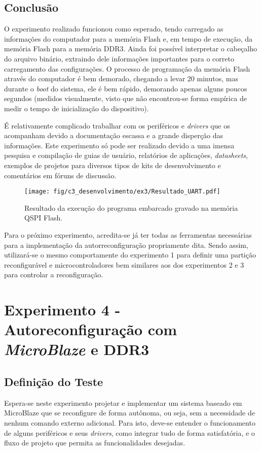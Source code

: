 \documentclass[11pt,a4paper,oneside]{book}
\begin{document}
\section{Conclusão}
O experimento realizado funcionou como esperado, tendo carregado as informações do computador para a memória Flash e, em tempo de execução, da memória Flash para a memória DDR3.
Ainda foi possível interpretar o cabeçalho do arquivo binário, extraindo dele informações importantes para o correto carregamento das configurações.
O processo de programação da memória Flash através do computador é bem demorado, chegando a levar 20 minutos, mas durante o \textit{boot} do sistema, ele é bem rápido, demorando apenas alguns poucos segundos (medidos visualmente, visto que não encontrou-se forma empírica de medir o tempo de inicialização do dispositivo).

É relativamente complicado trabalhar com os periféricos e \textit{drivers} que os acompanham devido a documentação escassa e a grande disperção das informações.
Este experimento só pode ser realizado devido a uma imensa pesquisa e compilação de guias de usuário, relatórios de aplicações, \textit{datasheets}, exemplos de projetos para diversos tipos de kits de desenvolvimento e comentários em fóruns de discussão.

\begin{figure}[htp]
\centering
\texttt{[image: fig/c3\_desenvolvimento/ex3/Resultado\_UART.pdf]}
\caption{Resultado da execução do programa embarcado gravado na memória QSPI Flash.}
\label{fig:ex3:resultado}
\end{figure}

Para o próximo experimento, acredita-se já ter todas as ferramentas necessárias para a implementação da autorreconfiguração propriamente dita.
Sendo assim, utilizará-se o mesmo comportamente do experimento 1 para definir uma partição reconfigurável e microcontroladores bem similares aos dos experimentos 2 e 3 para controlar a reconfiguração.


\chapter{Experimento 4 - Autoreconfiguração com \textit{MicroBlaze} e DDR3}
\section{Definição do Teste}
Espera-se neste experimento projetar e implementar um sistema baseado em MicroBlaze que se reconfigure de forma autônoma, ou seja, sem a necessidade de nenhum comando externo adicional.
Para isto, deve-se entender o funcionamento de alguns periféricos e seus \textit{drivers}, como integrar tudo de forma satisfatória, e o fluxo de projeto que permita as funcionalidades desejadas.
\end{document}
